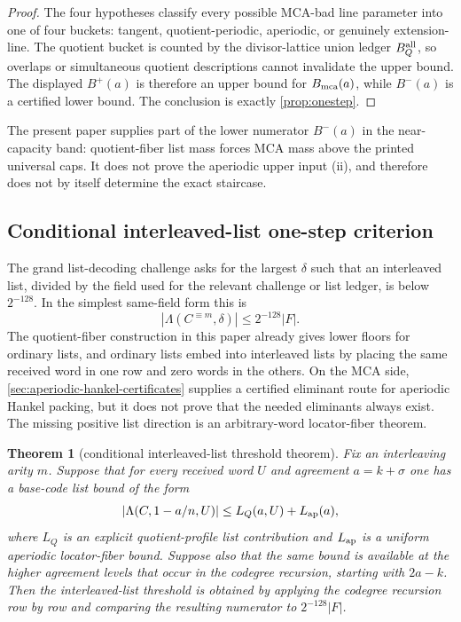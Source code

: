 \documentclass[11pt]{article}
\newtheorem{theorem}{Theorem}[section]
\theoremstyle{definition}
\theoremstyle{remark}
\begin{document}
\begin{proof}
The four hypotheses classify every possible MCA-bad line parameter into one of
four buckets: tangent, quotient-periodic, aperiodic, or genuinely extension-line.
The quotient bucket is counted by the divisor-lattice union ledger $B_Q^{\rm all}$,
so overlaps or simultaneous quotient descriptions cannot invalidate the upper
bound.  The displayed $B^+(a)$ is therefore an upper bound for $B_{\rm mca}(a)$, while
$B^-(a)$ is a certified lower bound.  The conclusion is exactly
\cref{prop:onestep}.
\end{proof}

The present paper supplies part of the lower numerator $B^-(a)$ in the
near-capacity band: quotient-fiber list mass forces MCA mass above the printed
universal caps.  It does not prove the aperiodic upper input (ii), and therefore
does not by itself determine the exact staircase.

\subsection{Conditional interleaved-list one-step criterion}

The grand list-decoding challenge asks for the largest $\delta$ such that an
interleaved list, divided by the field used for the relevant challenge or list
ledger, is below $2^{-128}$.  In the simplest same-field form this is
\[
        |\Lambda(C^{\equiv m},\delta)|\le 2^{-128}|F| .
\]
The quotient-fiber construction in this paper already gives lower floors for
ordinary lists, and ordinary lists embed into interleaved lists by placing the
same received word in one row and zero words in the others.  On the MCA side,
\cref{sec:aperiodic-hankel-certificates} supplies a certified eliminant route
for aperiodic Hankel packing, but it does not prove that the needed eliminants
always exist.  The missing positive list direction is an arbitrary-word
locator-fiber theorem.

\begin{theorem}[conditional interleaved-list threshold theorem]\label{thm:conditional-list}
Fix an interleaving arity $m$.  Suppose that for every received word $U$ and
agreement $a=k+\sigma$ one has a base-code list bound of the form
\[
        |\Lambda(C,1-a/n,U)|
        \le
        L_Q(a,U)+L_{\rm ap}(a),
\]
where $L_Q$ is an explicit quotient-profile list contribution and
$L_{\rm ap}$ is a uniform aperiodic locator-fiber bound.  Suppose also that the
same bound is available at the higher agreement levels that occur in the
codegree recursion, starting with $2a-k$.  Then the interleaved-list threshold is
obtained by applying the codegree recursion row by row and comparing the
resulting numerator to $2^{-128}|F|$.
\end{theorem}
\end{document}
